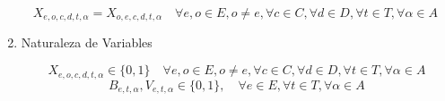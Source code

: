 \begin{enumerate}
        \[ X_{e,o,c,d,t,\alpha} = X_{o,e,c,d,t,\alpha} \quad \forall e,o\in E, o\neq e, \forall c\in C,\forall d\in D,\forall t\in T, \forall \alpha\in A\  \]
    
        
    \item Naturaleza de Variables
    
        \[X_{e,o,c,d,t,\alpha}\in \{ 0,1 \} \quad \forall e,o\in E, o\neq e, \forall c\in C,\forall d\in D,\forall t\in T, \forall \alpha\in A \]
        \[B_{e,t,\alpha},V_{e,t,\alpha}\in \{ 0,1 \}, \quad \forall e \in E, \forall t \in T, \forall \alpha \in A\]

    
\end{enumerate}

\vspace{5pt}
